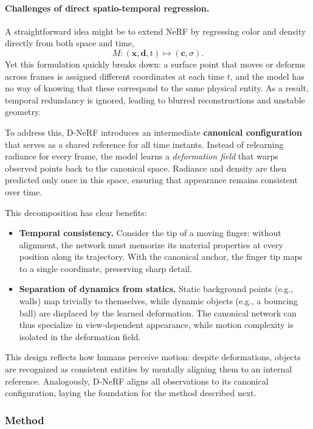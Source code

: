 \begin{enrichment}
\begin{enrichment}
    \paragraph{Challenges of direct spatio-temporal regression.}
    \noindent
    A straightforward idea might be to extend NeRF by regressing color and density directly from both space and time,
    \[
    M : (\mathbf{x}, \mathbf{d}, t) \mapsto (\mathbf{c}, \sigma).
    \]
    Yet this formulation quickly breaks down: a surface point that moves or deforms across frames is assigned different coordinates at each time $t$, and the model has no way of knowing that these correspond to the same physical entity.
    As a result, temporal redundancy is ignored, leading to blurred reconstructions and unstable geometry.
    
    To address this, D-NeRF introduces an intermediate \textbf{canonical configuration} that serves as a shared reference for all time instants.
    Instead of relearning radiance for every frame, the model learns a \emph{deformation field} that warps observed points back to the canonical space.
    Radiance and density are then predicted only once in this space, ensuring that appearance remains consistent over time.
    
    This decomposition has clear benefits:
    \begin{itemize}
        \item \textbf{Temporal consistency.} Consider the tip of a moving finger: without alignment, the network must memorize its material properties at every position along its trajectory. With the canonical anchor, the finger tip maps to a single coordinate, preserving sharp detail.
        \item \textbf{Separation of dynamics from statics.} Static background points (e.g., walls) map trivially to themselves, while dynamic objects (e.g., a bouncing ball) are displaced by the learned deformation. The canonical network can thus specialize in view-dependent appearance, while motion complexity is isolated in the deformation field.
    \end{itemize}
    
    \noindent
    This design reflects how humans perceive motion: despite deformations, objects are recognized as consistent entities by mentally aligning them to an internal reference.
    Analogously, D-NeRF aligns all observations to its canonical configuration, laying the foundation for the method described next.
    
    \subsubsection{Method}
    \label{subsec:chapter23_dnerf_method}
    

\end{enrichment}
\end{enrichment}
